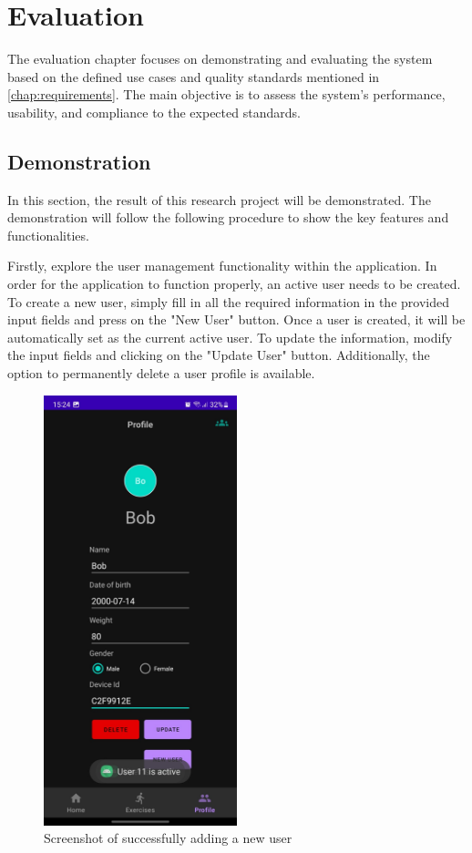 \chapter{Evaluation}

The evaluation chapter focuses on demonstrating and evaluating the system based on the defined use cases and quality standards mentioned in \autoref{chap:requirements}. 
The main objective is to assess the system's performance, usability, and compliance to the expected standards. 

\section{Demonstration}
In this section, the result of this research project will be demonstrated. The demonstration will follow the following procedure to show the key features and functionalities.

Firstly, explore the user management functionality within the application. 
In order for the application to function properly, an active user needs to be created.
To create a new user, simply fill in all the required information in the provided input fields and press on the "New User" button.
Once a user is created, it will be automatically set as the current active user.
To update the information, modify the input fields and clicking on the "Update User" button.
Additionally, the option to permanently delete a user profile is available.
\begin{figure}[H]
    \centering
    \includegraphics[width=0.5\textwidth]{images/add-new-user.jpeg}
    \caption{Screenshot of successfully adding a new user}
    \label{fig:add-new-user-screenshot}
\end{figure}

